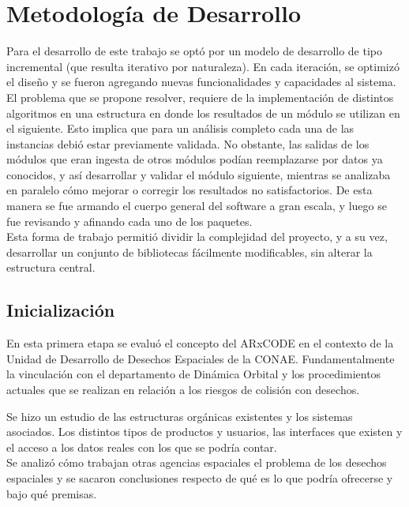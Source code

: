 \chapter{Metodología de Desarrollo}
\label{chap:metodologia}
Para el desarrollo de este trabajo se opt\'o por un modelo de desarrollo de tipo incremental (que resulta iterativo por naturaleza).
En cada iteraci\'on, se optimiz\'o el dise\~no y se fueron agregando nuevas funcionalidades y capacidades al sistema.\\

El problema que se propone resolver, requiere de la implementaci\'on de distintos algoritmos en una estructura en donde los resultados de un m\'odulo se utilizan en el siguiente. Esto implica que para un an\'alisis completo cada una de las instancias debi\'o estar previamente validada.
No obstante, las salidas de los m\'odulos que eran ingesta de otros m\'odulos pod\'ian reemplazarse por datos ya conocidos, y as\'i desarrollar y validar el m\'odulo siguiente, mientras se analizaba en paralelo c\'omo mejorar o corregir los resultados no satisfactorios. De esta manera se fue armando el cuerpo general del software a gran escala, y luego se fue revisando y afinando cada uno de los paquetes.\\

Esta forma de trabajo permiti\'o dividir la complejidad del proyecto, y a su vez, desarrollar un conjunto de bibliotecas f\'acilmente modificables, sin alterar la estructura central.\\

\section{Inicializaci\'on}
En esta primera etapa se evalu\'o  el concepto del ARxCODE en el contexto de la Unidad de Desarrollo de Desechos Espaciales de la CONAE. Fundamentalmente la vinculaci\'on con el departamento de Din\'amica Orbital y los procedimientos actuales que se realizan en relaci\'on a los riesgos de colisi\'on con desechos.

Se hizo un estudio de las estructuras org\'anicas existentes y los sistemas asociados. Los distintos tipos de productos y usuarios, las interfaces que existen y el acceso a los datos reales con los que se  podr\'ia contar.\\

Se analiz\'o c\'omo trabajan otras agencias espaciales el problema de los desechos espaciales y se sacaron conclusiones respecto de qu\'e es lo que podr\'ia ofrecerse y bajo qu\'e premisas.\\

